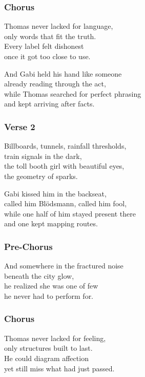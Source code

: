 \documentclass[]{article}
\begin{document}
\subsubsection{Chorus}\label{chorus-17}

Thomas never lacked for language,\\
only words that fit the truth.\\
Every label felt dishonest\\
once it got too close to use.

And Gabi held his hand like someone\\
already reading through the act,\\
while Thomas searched for perfect phrasing\\
and kept arriving after facts.

\subsubsection{Verse 2}\label{verse-2-5}

Billboards, tunnels, rainfall thresholds,\\
train signals in the dark,\\
the toll booth girl with beautiful eyes,\\
the geometry of sparks.

Gabi kissed him in the backseat,\\
called him Blödsmann, called him fool,\\
while one half of him stayed present there\\
and one kept mapping routes.

\subsubsection{Pre-Chorus}\label{pre-chorus-10}

And somewhere in the fractured noise\\
beneath the city glow,\\
he realized she was one of few\\
he never had to perform for.

\subsubsection{Chorus}\label{chorus-18}

Thomas never lacked for feeling,\\
only structures built to last.\\
He could diagram affection\\
yet still miss what had just passed.
\end{document}
